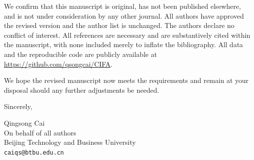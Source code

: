 \documentclass[11pt]{article}
\begin{document}
We confirm that this manuscript is original, has not been published
elsewhere, and is not under consideration by any other journal. All authors
have approved the revised version and the author list is unchanged. The
authors declare no conflict of interest. All references are necessary and
are substantively cited within the manuscript, with none included merely
to inflate the bibliography. All data and the reproducible code are
publicly available at
\url{https://github.com/qsongcai/CIFA}.

We hope the revised manuscript now meets the requirements and remain at
your disposal should any further adjustments be needed.

Sincerely,

Qingsong Cai\\
On behalf of all authors\\
Beijing Technology and Business University\\
\texttt{caiqs@btbu.edu.cn}
\end{document}
